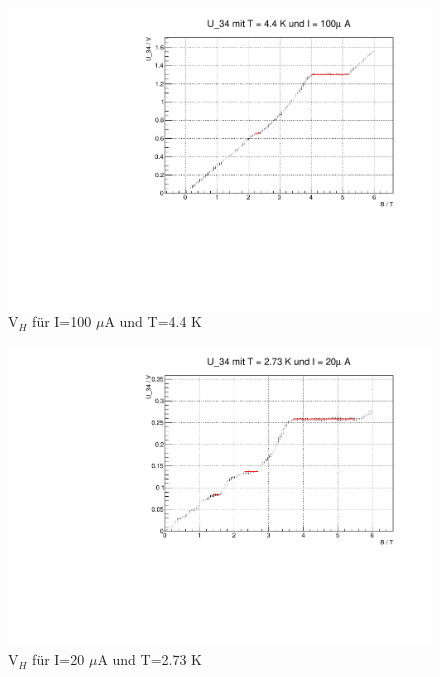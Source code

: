 \begin{figure}
\label{}
\centering
\includegraphics[scale = 0.5]{../plots/U_34_100muA_4400mK.pdf}
\caption{$\text{V}_H$ für I=100 $\mu$A und T=4.4 K}
\end{figure}

\begin{figure}
\label{}
\centering
\includegraphics[scale = 0.5]{../plots/U_34_20muA_2730mK.pdf}
\caption{$\text{V}_H$ für I=20 $\mu$A und T=2.73 K}
\end{figure}

